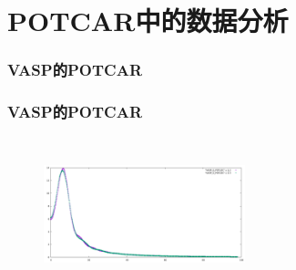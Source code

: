 \section{\rm{POTCAR}中的数据分析}
\frame
{
	\frametitle{\rm{VASP}的\rm{POTCAR}}
\centering
\vspace{-0.15in}
\fontsize{4.8pt}{4.2pt}\selectfont{
}
}

\frame
{
	\frametitle{\rm{VASP}的\rm{POTCAR}}
\begin{minipage}{0.40\textwidth}
\centering
\fontsize{2.7pt}{1.2pt}\selectfont{
}
\end{minipage}
\begin{minipage}{0.58\textwidth}
{\fontsize{5.5pt}{4.2pt}}
\begin{figure}[t!]
\centering
\vspace{-0.15in}
\includegraphics[width=2.3in,height=1.75in,viewport=0 0 1150 650, clip]{Figures/POT_G-dat.pdf}
\label{local-potential}
\end{figure}
\end{minipage}
}

